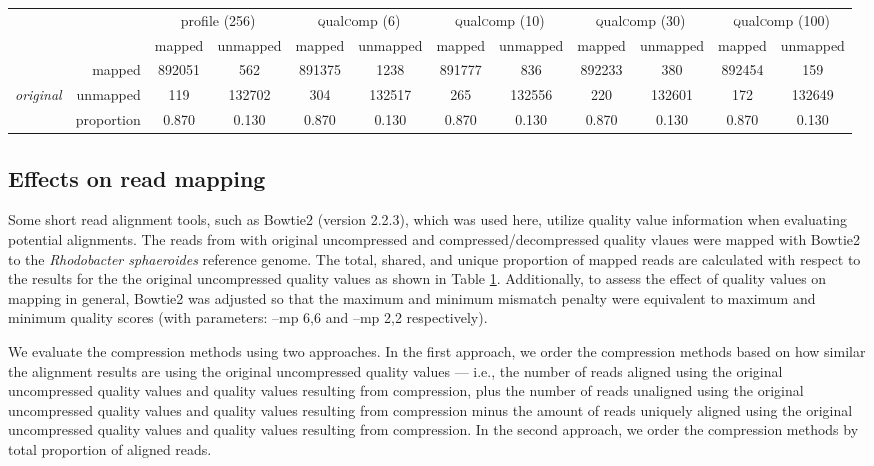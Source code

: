\documentclass{bioinfo}
\begin{document}
\begin{table}[!tbhp]
\begin{small}
\begin{tabular}{lr|cc|cc|cc|cc|cc}
&  & \multicolumn{2}{c|}{profile (256)} & \multicolumn{2}{c|}{\textsc{q}ual\textsc{c}omp (6)} & \multicolumn{2}{c|}{\textsc{q}ual\textsc{c}omp (10)} & \multicolumn{2}{c|}{\textsc{q}ual\textsc{c}omp (30)} & \multicolumn{2}{c}{\textsc{q}ual\textsc{c}omp (100)} \\
& &  mapped & unmapped & mapped & unmapped & mapped & unmapped & mapped & unmapped & mapped & unmapped \\ 
\cline{2-12}
& mapped & 892051 & 562 & 891375 & 1238 & 891777 & 836 & 892233 & 380 & 892454 & 159 \\ 
{\em original}  & unmapped & 119 & 132702 & 304 & 132517 & 265 & 132556 & 220 & 132601 & 172 & 132649 \\ 
\cline{2-12}
& proportion & 0.870 & 0.130 & 0.870 & 0.130 & 0.870 & 0.130 & 0.870 & 0.130 & 0.870 & 0.130 \\
\end{tabular}
\end{small}

\label{tab:aligner}
\end{table}

\subsection{Effects on read mapping}

Some short read alignment tools, such as Bowtie2 (version 2.2.3),
which was used here, utilize quality value information when evaluating
potential alignments. The reads from with original uncompressed and
compressed/decompressed quality vlaues were mapped with Bowtie2 to the
\textit{Rhodobacter sphaeroides} reference genome. The total, shared,
and unique proportion of mapped reads are calculated with respect to
the results for the the original uncompressed quality values as shown
in Table \ref{tab:aligner}. Additionally, to assess the effect of
quality values on mapping in general, Bowtie2 was adjusted so that the
maximum and minimum mismatch penalty were equivalent to maximum and
minimum quality scores (with parameters: --mp 6,6 and --mp 2,2
respectively).

We evaluate the compression methods using two approaches. In the first
approach, we order the compression methods based on how similar the
alignment results are using the original uncompressed quality values
--- i.e., the number of reads aligned using the original uncompressed
quality values and quality values resulting from compression, plus the
number of reads unaligned using the original uncompressed quality
values and quality values resulting from compression minus the amount
of reads uniquely aligned using the original uncompressed quality
values and quality values resulting from compression. In the second
approach, we order the compression methods by total proportion of
aligned reads.
\end{document}
